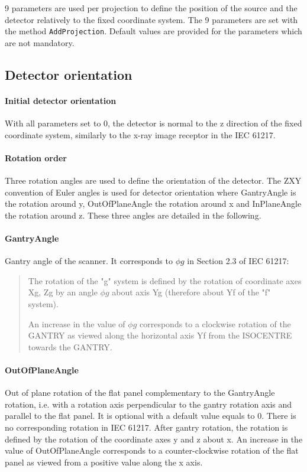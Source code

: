 \documentclass{article}
\newcommand{\biec}{\begin{quote}\begin{small}}
\newcommand{\eiec}{\end{small}\end{quote}}
\begin{document}
9 parameters are used per projection to define the position of the source and the detector relatively to the fixed coordinate system. The 9 parameters are set with the method \verb+AddProjection+. Default values are provided for the parameters which are not mandatory.

\subsection{Detector orientation}

\paragraph{Initial detector orientation}

With all parameters set to 0, the detector is normal to the z direction of the fixed coordinate system, similarly to the x-ray image receptor in the IEC 61217.

\paragraph{Rotation order} Three rotation angles are used to define the orientation of the detector. The ZXY convention of Euler angles is used for detector orientation where GantryAngle is the rotation around y, OutOfPlaneAngle the rotation around x and InPlaneAngle the rotation around z. These three angles are detailed in the following.

\paragraph{GantryAngle}

Gantry angle of the scanner. It corresponds to $\phi g$ in Section 2.3 of IEC 61217:

\biec
The rotation of the "g" system is defined by the rotation of coordinate axes Xg, Zg by an angle $\phi g$ about axis Yg (therefore about Yf of the "f" system).

An increase in the value of $\phi g$ corresponds to a clockwise rotation of the GANTRY as viewed along the horizontal axis Yf from the ISOCENTRE towards the GANTRY.
\eiec

\paragraph{OutOfPlaneAngle}

Out of plane rotation of the flat panel complementary to the GantryAngle rotation, i.e. with a rotation axis perpendicular to the gantry rotation axis and parallel to the flat panel. It is optional with a default value equals to 0. There is no corresponding rotation in IEC 61217. After gantry rotation, the rotation is defined by the rotation of the coordinate axes y and z about x. An increase in the value of OutOfPlaneAngle corresponds to a counter-clockwise rotation of the flat panel as viewed from a positive value along the x axis.
\end{document}
